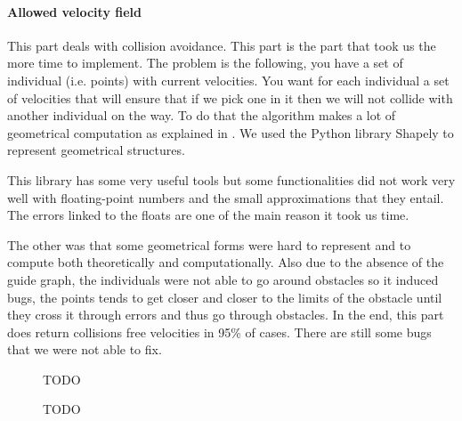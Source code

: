 \paragraph{Allowed velocity field}

This part deals with collision avoidance. This part is the part that
took us the more time to implement. The problem is the following, you
have a set of individual (i.e. points) with current velocities. You
want for each individual a set of velocities that will ensure that if
we pick one in it then we will not collide with another individual on
the way. To do that the algorithm makes a lot of geometrical
computation as explained in \cite{vandenBerg2011}. We used the Python
library Shapely to represent geometrical structures.

This library has some very useful tools but some functionalities did
not work very well with floating-point numbers and the small
approximations that they entail. The errors linked to the floats are
one of the main reason it took us time. 


The other was that some geometrical forms were hard to represent and
to compute both theoretically and computationally.  Also due to the
absence of the guide graph, the individuals were not able to go around
obstacles so it induced bugs, the points tends to get closer and
closer to the limits of the obstacle until they cross it through
errors and thus go through obstacles.  In the end, this part does
return collisions free velocities in 95\% of cases. There are still
some bugs that we were not able to fix.  %


\begin{figure}[h!]
  \centering
  \begin{subfigure}[t]{0.45\textwidth}
    \scalebox{.4}{}
  \end{subfigure} %
  \begin{subfigure}[t]{0.45\textwidth}
  \scalebox{.4}{}
  \end{subfigure}
  \caption{TODO}
\end{figure}

\begin{figure}[h!]
  \centering
  \scalebox{.475}{}
  \caption{TODO}
\end{figure}



